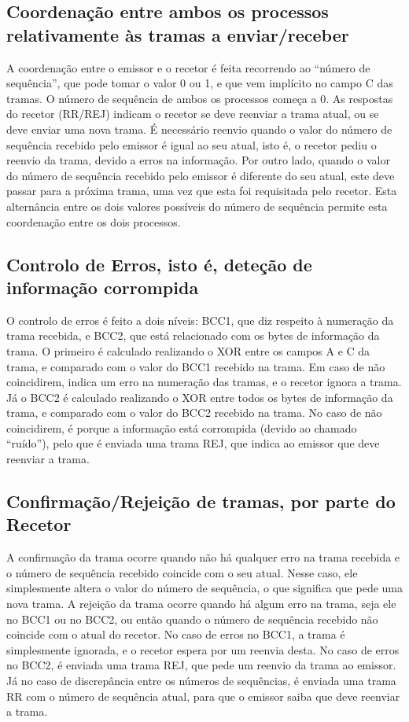 \documentclass[article, a4paper, 11pt, oneside]{memoir}
\begin{document}
\subsection{Coordenação entre ambos os processos relativamente às tramas a enviar/receber}
A coordenação entre o emissor e o recetor é feita recorrendo ao “número de sequência”,
 que pode tomar o valor 0 ou 1, e que vem implícito no campo C das tramas. 
 O número de sequência de ambos os processos começa a 0. 
 As respostas do recetor (RR/REJ) indicam o recetor se deve reenviar a trama atual,
  ou se deve enviar uma nova trama. É necessário reenvio quando o valor do número de sequência 
  recebido pelo emissor é igual ao seu atual, isto é, o recetor pediu o reenvio da trama, 
  devido a erros na informação. Por outro lado, quando o valor do número de sequência recebido 
  pelo emissor é diferente do seu atual, este deve passar para a próxima trama, 
  uma vez que esta foi requisitada pelo recetor. Esta alternância entre os dois 
  valores possíveis do número de sequência permite esta coordenação entre os dois processos.

\subsection{Controlo de Erros, isto é, deteção de informação corrompida}
O controlo de erros é feito a dois níveis: BCC1, que diz respeito à numeração da trama recebida,
 e BCC2, que está relacionado com os bytes de informação da trama. 
 O primeiro é calculado realizando o XOR entre os campos A e C da trama, 
 e comparado com o valor do BCC1 recebido na trama. Em caso de não coincidirem, 
 indica um erro na numeração das tramas, e o recetor ignora a trama. Já o BCC2 é 
 calculado realizando o XOR entre todos os bytes de informação da trama, e 
 comparado com o valor do BCC2 recebido na trama. No caso de não coincidirem, 
 é porque a informação está corrompida (devido ao chamado “ruído”), 
 pelo que é enviada uma trama REJ, que indica ao emissor que deve reenviar a trama.

\subsection{Confirmação/Rejeição de tramas, por parte do Recetor}
A confirmação da trama ocorre quando não há qualquer erro na trama recebida e o número de sequência recebido coincide com o seu atual. 
Nesse caso, ele simplesmente altera o valor do número de sequência, o que significa que pede uma nova trama.
A rejeição da trama ocorre quando há algum erro na trama, seja ele no BCC1 ou no BCC2, ou então quando o número de sequência recebido não coincide com o atual do recetor.
 No caso de erros no BCC1, a trama é simplesmente ignorada, e o recetor espera por um reenvia desta. 
 No caso de erros no BCC2, é enviada uma trama REJ, que pede um reenvio da trama ao emissor. 
 Já no caso de discrepância entre os números de sequências, é enviada uma trama RR com o número de sequência atual, para que o emissor saiba que deve reenviar a trama.
\end{document}
